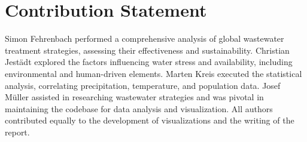 \documentclass{article}
\theoremstyle{plain}
\theoremstyle{definition}
\theoremstyle{remark}
\begin{document}
\section*{Contribution Statement}

Simon Fehrenbach performed a comprehensive analysis of global wastewater treatment strategies, assessing their effectiveness and sustainability.
Christian Jestädt explored the factors influencing water stress and availability, including environmental and human-driven elements.
Marten Kreis executed the statistical analysis, correlating precipitation, temperature, and population data.
Josef Müller assisted in researching wastewater strategies and was pivotal in maintaining the codebase for data analysis and visualization.
All authors contributed equally to the development of visualizations and the writing of the report.


\end{document}

